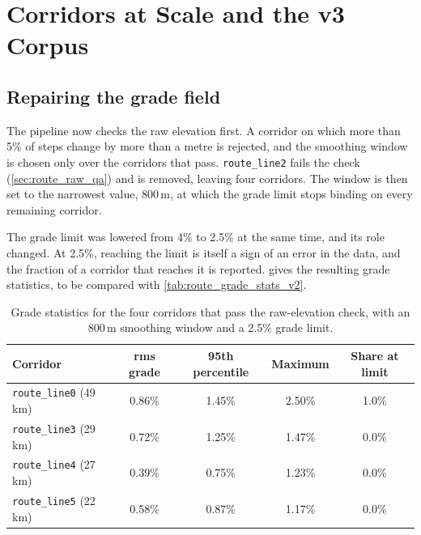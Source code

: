 \chapter{Corridors at Scale and the v3 Corpus}
\label{ch:corpus_v3}



\section{Repairing the grade field}
\label{sec:route_grade_fix}

The pipeline now checks the raw elevation first. A corridor on which more than 5\% of steps change by more than a metre is rejected, and the smoothing window is chosen only over the corridors that pass. \texttt{route\_line2} fails the check (\cref{sec:route_raw_qa}) and is removed, leaving four corridors. The window is then set to the narrowest value, 800\,m, at which the grade limit stops binding on every remaining corridor.

The grade limit was lowered from 4\% to 2.5\% at the same time, and its role changed. At 2.5\%, reaching the limit is itself a sign of an error in the data, and the fraction of a corridor that reaches it is reported.  gives the resulting grade statistics, to be compared with \cref{tab:route_grade_stats_v2}.

\begin{table}[htbp]
    \centering
    \begin{tabular}{lcccc}
        \toprule
        Corridor & rms grade & 95th percentile & Maximum & Share at limit \\
        \midrule
        \texttt{route\_line0} (49\,km) & 0.86\% & 1.45\% & 2.50\% & 1.0\% \\
        \texttt{route\_line3} (29\,km) & 0.72\% & 1.25\% & 1.47\% & 0.0\% \\
        \texttt{route\_line4} (27\,km) & 0.39\% & 0.75\% & 1.23\% & 0.0\% \\
        \texttt{route\_line5} (22\,km) & 0.58\% & 0.87\% & 1.17\% & 0.0\% \\
        \bottomrule
    \end{tabular}
    \caption{Grade statistics for the four corridors that pass the raw-elevation check, with an 800\,m smoothing window and a 2.5\% grade limit.}
    \label{tab:route_grade_stats}
\end{table}

